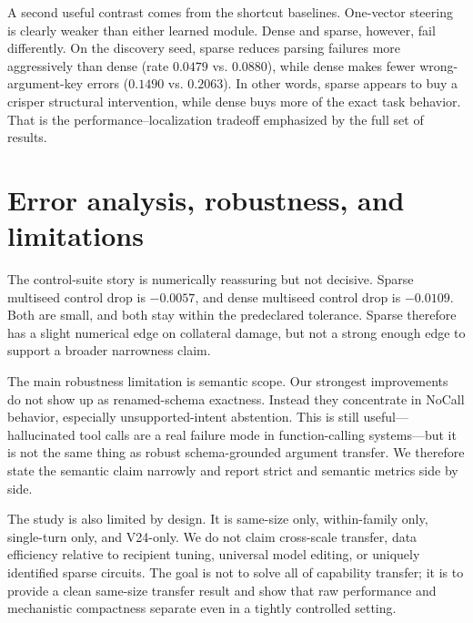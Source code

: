\documentclass{article}
\begin{document}
\begin{table}[t]
\centering
\caption{Pruning analysis for the sparse same-size intervention. The selected one-feature subset retains nearly half of the full sparse gain and clearly outperforms random one-feature controls, but it does not justify a uniqueness claim.}
\label{tab:localization}
\small

\end{table}

A second useful contrast comes from the shortcut baselines. One-vector steering is clearly weaker than either learned module. Dense and sparse, however, fail differently. On the discovery seed, sparse reduces parsing failures more aggressively than dense (rate $0.0479$ vs. $0.0880$), while dense makes fewer wrong-argument-key errors ($0.1490$ vs. $0.2063$). In other words, sparse appears to buy a crisper structural intervention, while dense buys more of the exact task behavior. That is the performance--localization tradeoff emphasized by the full set of results.

\section{Error analysis, robustness, and limitations}
The control-suite story is numerically reassuring but not decisive. Sparse multiseed control drop is $-0.0057$, and dense multiseed control drop is $-0.0109$. Both are small, and both stay within the predeclared tolerance. Sparse therefore has a slight numerical edge on collateral damage, but not a strong enough edge to support a broader narrowness claim.

The main robustness limitation is semantic scope. Our strongest improvements do not show up as renamed-schema exactness. Instead they concentrate in NoCall behavior, especially unsupported-intent abstention. This is still useful---hallucinated tool calls are a real failure mode in function-calling systems---but it is not the same thing as robust schema-grounded argument transfer. We therefore state the semantic claim narrowly and report strict and semantic metrics side by side.

The study is also limited by design. It is same-size only, within-family only, single-turn only, and V24-only. We do not claim cross-scale transfer, data efficiency relative to recipient tuning, universal model editing, or uniquely identified sparse circuits. The goal is not to solve all of capability transfer; it is to provide a clean same-size transfer result and show that raw performance and mechanistic compactness separate even in a tightly controlled setting.
\end{document}
